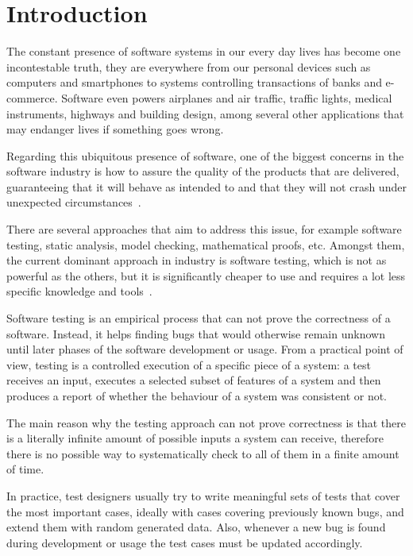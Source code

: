 \chapter{Introduction}

The constant presence of software systems in our every day lives has become one incontestable truth, they are everywhere from our personal devices such as computers and smartphones to systems controlling transactions of banks and e-commerce. Software even powers airplanes and air traffic, traffic lights, medical instruments, highways and building design, among several other applications that may endanger lives if something goes wrong.

Regarding this ubiquitous presence of software, one of the biggest concerns in the software industry is how to assure the quality of the products that are delivered, guaranteeing that it will behave as intended to and that they will not crash under unexpected circumstances~\cite{Ammann2008}.

There are several approaches that aim to address this issue, for example software testing, static analysis, model checking, mathematical proofs, etc. Amongst them, the current dominant approach in industry is software testing, which is not as powerful as the others, but it is significantly cheaper to use and requires a lot less specific knowledge and tools~\cite{Meyer2008, Utting2006}.

Software testing is an empirical process that can not prove the correctness of a software. Instead, it helps finding bugs that would otherwise remain unknown until later phases of the software development or usage. From a practical point of view, testing is a controlled execution of a specific piece of a system: a test receives an input, executes a selected subset of features of a system and then produces a report of whether the behaviour of a system was consistent or not. 

The main reason why the testing approach can not prove correctness is that there is a literally infinite amount of possible inputs a system can receive, therefore there is no possible way to systematically check to all of them in a finite amount of time.

In practice, test designers usually try to write meaningful sets of tests that cover the most important cases, ideally with cases covering previously known bugs, and extend them with random generated data. Also, whenever a new bug is found during development or usage the test cases must be updated accordingly.

